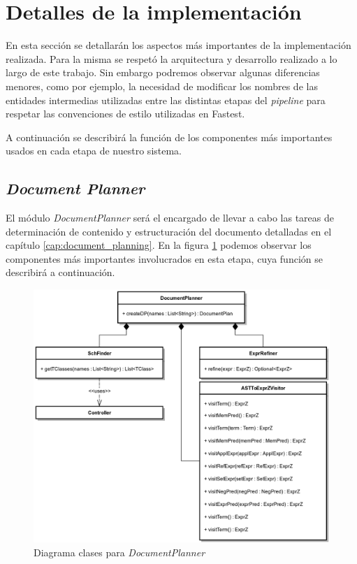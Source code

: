 \section{Detalles de la implementación}

En esta sección se detallarán los aspectos más importantes de la implementación realizada. Para la misma se respetó la arquitectura y desarrollo realizado a lo largo de este trabajo. Sin embargo podremos observar algunas diferencias menores, como por ejemplo, la necesidad de modificar los nombres de las entidades intermedias utilizadas entre las distintas etapas del \textit{pipeline} para respetar las convenciones de estilo utilizadas en Fastest.

A continuación se describirá la función de los componentes más importantes usados en cada etapa de nuestro sistema.

\subsection{\textit{Document Planner}}

El módulo \emph{DocumentPlanner} será el encargado de llevar a cabo las tareas de determinación de contenido y estructuración del documento detalladas en el capítulo \ref{cap:document_planning}. En la figura \ref{fig:imp_documentplanner} podemos observar los componentes más importantes involucrados en esta etapa, cuya función se describirá a continuación. 

\begin{figure}[H]
  	\centering
	\includegraphics[scale=0.25]{img/documentplanner_imp.png}
	\caption{Diagrama clases para \textit{DocumentPlanner}}
  	\label{fig:imp_documentplanner}
\end{figure}

